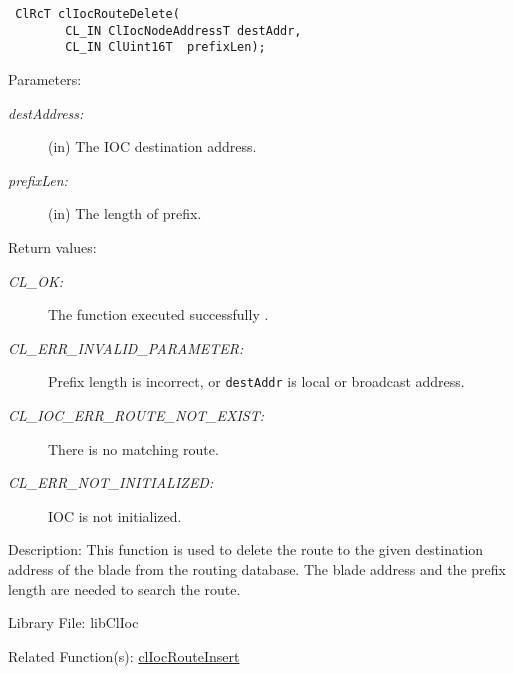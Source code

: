 \begin{flushleft}
\begin{Desc}
\footnotesize\begin{verbatim} ClRcT clIocRouteDelete(
        CL_IN ClIocNodeAddressT destAddr,
        CL_IN ClUint16T  prefixLen);
\end{verbatim}
\normalsize
\end{Desc}
\begin{Desc}
\item[Parameters:]
\begin{description}
\item[{\em dest\-Address:}](in) The IOC destination address. \item[{\em prefix\-Len:}](in) The length of prefix.\end{description}
\end{Desc}
\begin{Desc}
\item[Return values:]
\begin{description}
\item[{\em CL\_\-OK:}]The function executed successfully . 
\item[{\em CL\_\-ERR\_\-INVALID\_\-PARAMETER:}]Prefix length is incorrect, or {\tt{dest\-Addr}} is local or broadcast address. 
\item[{\em CL\_\-IOC\_\-ERR\_\-ROUTE\_\-NOT\_\-EXIST:}]There is no matching route. 
\item[{\em CL\_\-ERR\_\-NOT\_\-INITIALIZED:}]IOC is not initialized.\end{description}
\end{Desc}
\begin{Desc}
\item[Description:]This function is used to delete the route to the given destination address of the blade from the routing database. The blade address and
the prefix length are needed to search the route.\end{Desc}
\begin{Desc}
\item[Library File:]libClIoc\end{Desc}
\begin{Desc}
\item[Related Function(s):]\hyperlink{pageioc203}{cl\-Ioc\-Route\-Insert} \end{Desc}
\newpage





\end{flushleft}
